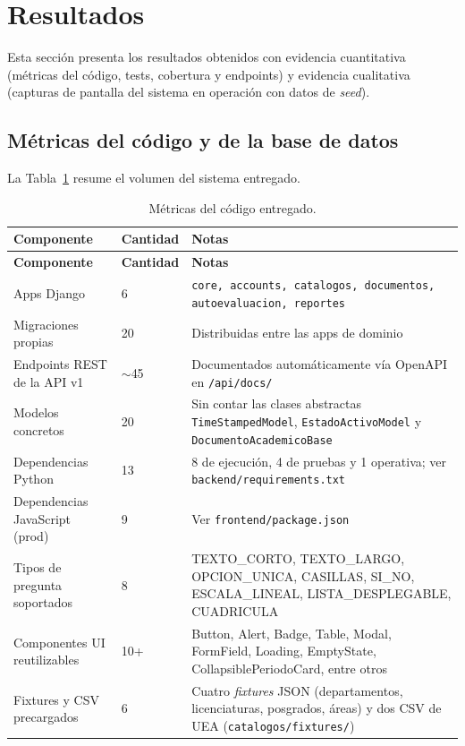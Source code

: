 \section{Resultados}\label{sec:resultados}
\justifying

Esta sección presenta los resultados obtenidos con evidencia cuantitativa (métricas del código, tests, cobertura y endpoints) y evidencia cualitativa (capturas de pantalla del sistema en operación con datos de \emph{seed}).

\subsection{Métricas del código y de la base de datos}

La Tabla~\ref{tab:metricasCodigo} resume el volumen del sistema entregado.

\begin{longtable}{p{} p{} p{}}
    \caption{Métricas del código entregado.}
    \label{tab:metricasCodigo}\\
    \toprule
    \textbf{Componente} & \textbf{Cantidad} & \textbf{Notas} \\
    \midrule
    \endfirsthead

    \toprule
    \textbf{Componente} & \textbf{Cantidad} & \textbf{Notas} \\
    \midrule
    \endhead

    Apps Django & 6 & \texttt{core, accounts, catalogos, documentos, autoevaluacion, reportes} \\
    \midrule
    Migraciones propias & 20 & Distribuidas entre las apps de dominio \\
    \midrule
    Endpoints REST de la API v1 & $\sim$45 & Documentados automáticamente vía OpenAPI en \texttt{/api/docs/} \\
    \midrule
    Modelos concretos & 20 & Sin contar las clases abstractas \texttt{TimeStampedModel}, \texttt{EstadoActivoModel} y \texttt{DocumentoAcademicoBase} \\
    \midrule
    Dependencias Python & 13 & 8 de ejecución, 4 de pruebas y 1 operativa; ver \texttt{backend/requirements.txt} \\
    \midrule
    Dependencias JavaScript (prod) & 9 & Ver \texttt{frontend/package.json} \\
    \midrule
    Tipos de pregunta soportados & 8 & TEXTO\_CORTO, TEXTO\_LARGO, OPCION\_UNICA, CASILLAS, SI\_NO, ESCALA\_LINEAL, LISTA\_DESPLEGABLE, CUADRICULA \\
    \midrule
    Componentes UI reutilizables & 10+ & Button, Alert, Badge, Table, Modal, FormField, Loading, EmptyState, CollapsiblePeriodoCard, entre otros \\
    \midrule
    Fixtures y CSV precargados & 6 & Cuatro \emph{fixtures} JSON (departamentos, licenciaturas, posgrados, áreas) y dos CSV de UEA (\texttt{catalogos/fixtures/}) \\
    \bottomrule
\end{longtable}

